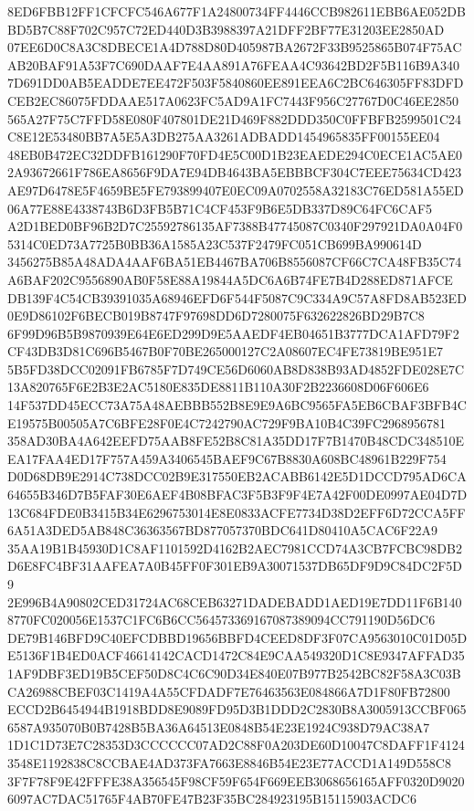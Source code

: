 \documentclass[UTF8,fontset=fandol,zihao=-4,a4paper]{ctexart}
\begin{document}
{{8ED6FBB12FF1CFCFC546A677F1A24800734FF4446CCB982611EBB6AE052DBBD5B7C88F702C957C72ED440D3B3988397A21DFF2BF77E31203EE2850AD
07EE6D0C8A3C8DBECE1A4D788D80D405987BA2672F33B9525865B074F75ACAB20BAF91A53F7C690DAAF7E4AA891A76FEAA4C93642BD2F5B116B9A340
7D691DD0AB5EADDE7EE472F503F5840860EE891EEA6C2BC646305FF83DFDCEB2EC86075FDDAAE517A0623FC5AD9A1FC7443F956C27767D0C46EE2850
565A27F75C7FFD58E080F407801DE21D469F882DDD350C0FFBFB2599501C24C8E12E53480BB7A5E5A3DB275AA3261ADBADD1454965835FF00155EE04
48EB0B472EC32DDFB161290F70FD4E5C00D1B23EAEDE294C0ECE1AC5AE02A93672661F786EA8656F9DA7E94DB4643BA5EBBBCF304C7EEE75634CD423
AE97D6478E5F4659BE5FE793899407E0EC09A0702558A32183C76ED581A55ED06A77E88E4338743B6D3FB5B71C4CF453F9B6E5DB337D89C64FC6CAF5
A2D1BED0BF96B2D7C25592786135AF7388B47745087C0340F297921DA0A04F05314C0ED73A7725B0BB36A1585A23C537F2479FC051CB699BA990614D
3456275B85A48ADA4AAF6BA51EB4467BA706B8556087CF66C7CA48FB35C74A6BAF202C9556890AB0F58E88A19844A5DC6A6B74FE7B4D288ED871AFCE
DB139F4C54CB39391035A68946EFD6F544F5087C9C334A9C57A8FD8AB523ED0E9D86102F6BECB019B8747F97698DD6D7280075F632622826BD29B7C8
6F99D96B5B9870939E64E6ED299D9E5AAEDF4EB04651B3777DCA1AFD79F2CF43DB3D81C696B5467B0F70BE265000127C2A08607EC4FE73819BE951E7
5B5FD38DCC02091FB6785F7D749CE56D6060AB8D838B93AD4852FDE028E7C13A820765F6E2B3E2AC5180E835DE8811B110A30F2B2236608D06F606E6
14F537DD45ECC73A75A48AEBBB552B8E9E9A6BC9565FA5EB6CBAF3BFB4CE19575B00505A7C6BFE28F0E4C7242790AC729F9BA10B4C39FC2968956781
358AD30BA4A642EEFD75AAB8FE52B8C81A35DD17F7B1470B48CDC348510EEA17FAA4ED17F757A459A3406545BAEF9C67B8830A608BC48961B229F754
D0D68DB9E2914C738DCC02B9E317550EB2ACABB6142E5D1DCCD795AD6CA64655B346D7B5FAF30E6AEF4B08BFAC3F5B3F9F4E7A42F00DE0997AE04D7D
13C684FDE0B3415B34E6296753014E8E0833ACFE7734D38D2EFF6D72CCA5FF6A51A3DED5AB848C36363567BD877057370BDC641D80410A5CAC6F22A9
35AA19B1B45930D1C8AF1101592D4162B2AEC7981CCD74A3CB7FCBC98DB2D6E8FC4BF31AAFEA7A0B45FF0F301EB9A30071537DB65DF9D9C84DC2F5D9
2E996B4A90802CED31724AC68CEB63271DADEBADD1AED19E7DD11F6B1408770FC020056E1537C1FC6B6CC564573369167087389094CC791190D56DC6
DE79B146BFD9C40EFCDBBD19656BBFD4CEED8DF3F07CA9563010C01D05DE5136F1B4ED0ACF46614142CACD1472C84E9CAA549320D1C8E9347AFFAD35
1AF9DBF3ED19B5CEF50D8C4C6C90D34E840E07B977B2542BC82F58A3C03BCA26988CBEF03C1419A4A55CFDADF7E76463563E084866A7D1F80FB72800
ECCD2B6454944B1918BDD8E9089FD95D3B1DDD2C2830B8A3005913CCBF0656587A935070B0B7428B5BA36A64513E0848B54E23E1924C938D79AC38A7
1D1C1D73E7C28353D3CCCCCC07AD2C88F0A203DE60D10047C8DAFF1F41243548E1192838C8CCBAE4AD373FA7663E8846B54E23E77ACCD1A149D558C8
3F7F78F9E42FFFE38A356545F98CF59F654F669EEB3068656165AFF0320D90206097AC7DAC51765F4AB70FE47B23F35BC284923195B15115903ACDC6
}}
\end{document}
